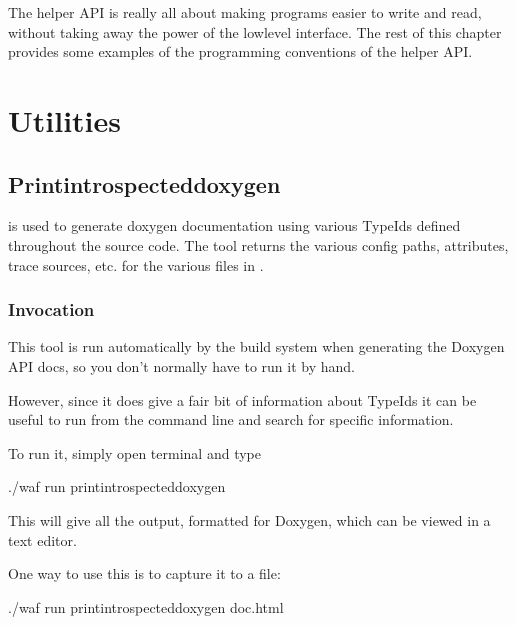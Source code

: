 \documentclass[letterpaper,10pt,english]{sphinxmanual}
\begin{document}
The helper API is really all about making  programs easier to write and
read, without taking away the power of the low\sphinxhyphen{}level interface. The rest of this
chapter provides some examples of the programming conventions of the helper API.


\chapter{Utilities}
\label{\detokenize{utilities:utilities}}\label{\detokenize{utilities:id1}}\label{\detokenize{utilities::doc}}

\section{Print\sphinxhyphen{}introspected\sphinxhyphen{}doxygen}
\label{\detokenize{utilities:print-introspected-doxygen}}
 is used to generate doxygen documentation
using various TypeIds defined throughout the  source code.
The tool returns the various config paths, attributes, trace sources,
etc. for the various files in .


\subsection{Invocation}
\label{\detokenize{utilities:invocation}}
This tool is run automatically by the build system when generating
the Doxygen API docs, so you don’t normally have to run it by hand.

However, since it does give a fair bit of information about TypeIds
it can be useful to run from the command line and
search for specific information.

To run it, simply open terminal and type

\begin{sphinxVerbatim}[commandchars=\\\{\}]
\PYGZdl{} ./waf \PYGZhy{}\PYGZhy{}run print\PYGZhy{}introspected\PYGZhy{}doxygen
\end{sphinxVerbatim}

This will give all the output, formatted for Doxygen, which can be viewed
in a text editor.

One way to use this is to capture it to a file:

\begin{sphinxVerbatim}[commandchars=\\\{\}]
\PYGZdl{} ./waf \PYGZhy{}\PYGZhy{}run print\PYGZhy{}introspected\PYGZhy{}doxygen \PYGZgt{} doc.html
\end{sphinxVerbatim}
\end{document}

